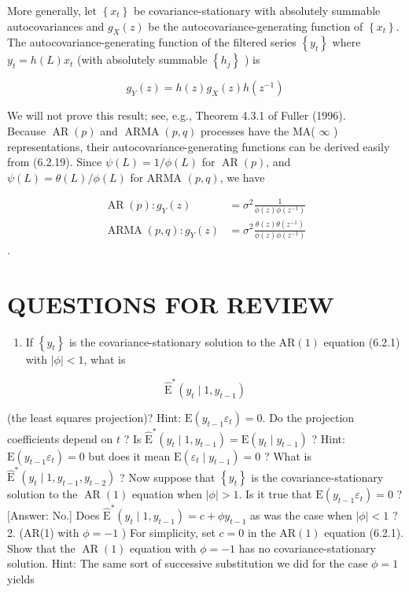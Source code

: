 \documentclass[10pt]{article}
\begin{document}
More generally, let $\left\{x_{t}\right\}$ be covariance-stationary with absolutely summable autocovariances and $g_{X}(z)$ be the autocovariance-generating function of $\left\{x_{t}\right\}$. The autocovariance-generating function of the filtered series $\left\{y_{t}\right\}$ where $y_{t}=h(L) x_{t}$ (with absolutely summable $\left\{h_{j}\right\}$ ) is


\begin{equation*}
g_{Y}(z)=h(z) g_{X}(z) h\left(z^{-1}\right) \tag{6.2.20}
\end{equation*}


We will not prove this result; see, e.g., Theorem 4.3.1 of Fuller (1996).\\
Because $\operatorname{AR}(p)$ and $\operatorname{ARMA}(p, q)$ processes have the MA( $\infty$ ) representations, their autocovariance-generating functions can be derived easily from (6.2.19). Since $\psi(L)=1 / \phi(L)$ for $\operatorname{AR}(p)$, and $\psi(L)=\theta(L) / \phi(L)$ for ARMA $(p, q)$, we have


\begin{align*}
\operatorname{AR}(p): g_{Y}(z) & =\sigma^{2} \frac{1}{\phi(z) \phi\left(z^{-1}\right)}  \tag{6.2.21}\\
\operatorname{ARMA}(p, q): g_{Y}(z) & =\sigma^{2} \frac{\theta(z) \theta\left(z^{-1}\right)}{\phi(z) \phi\left(z^{-1}\right)} \tag{6.2.22}
\end{align*} .


\section*{QUESTIONS FOR REVIEW}
\begin{enumerate}
  \item If $\left\{y_{t}\right\}$ is the covariance-stationary solution to the $\mathrm{AR}(1)$ equation (6.2.1) with $|\phi|<1$, what is
\end{enumerate}

$$
\widehat{\mathrm{E}}^{*}\left(y_{t} \mid 1, y_{t-1}\right)
$$

(the least squares projection)? Hint: $\mathrm{E}\left(y_{t-1} \varepsilon_{t}\right)=0$. Do the projection coefficients depend on $t$ ? Is $\widehat{\mathrm{E}}^{*}\left(y_{t} \mid 1, y_{t-1}\right)=\mathrm{E}\left(y_{t} \mid y_{t-1}\right)$ ? Hint: $\mathrm{E}\left(y_{t-1} \varepsilon_{t}\right)=0$ but does it mean $\mathrm{E}\left(\varepsilon_{t} \mid y_{t-1}\right)=0$ ? What is $\widehat{\mathrm{E}}^{*}\left(y_{t} \mid 1, y_{t-1}, y_{t-2}\right)$ ? Now suppose that $\left\{y_{t}\right\}$ is the covariance-stationary solution to the $\operatorname{AR}(1)$ equation when $|\phi|>1$. Is it true that $\mathrm{E}\left(y_{t-1} \varepsilon_{t}\right)=0$ ? [Answer: No.] Does $\widehat{\mathrm{E}}^{*}\left(y_{t} \mid\right. \left.1, y_{t-1}\right)=c+\phi y_{t-1}$ as was the case when $|\phi|<1$ ?\\
2. (AR(1) with $\phi=-1$ ) For simplicity, set $c=0$ in the $\mathrm{AR}(1)$ equation (6.2.1). Show that the $\operatorname{AR}(1)$ equation with $\phi=-1$ has no covariance-stationary solution. Hint: The same sort of successive substitution we did for the case $\phi=1$ yields
\end{document}
